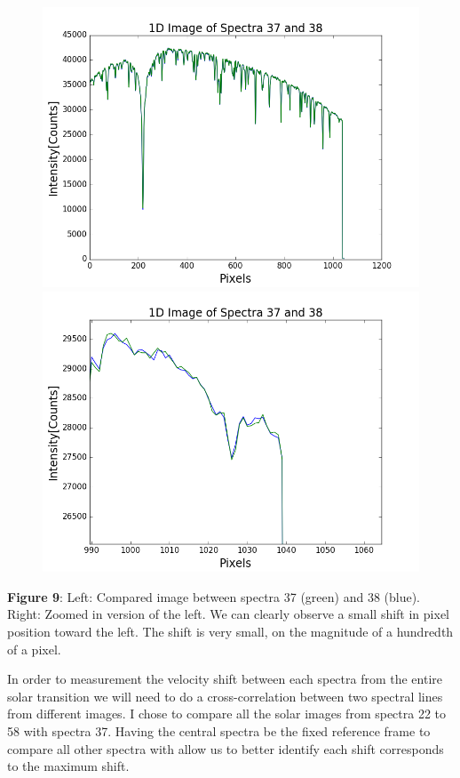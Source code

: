 \documentclass[onecolumn, 12pt, a4paper]{article}
\begin{document}
\begin{subfigure}{\linewidth}\hspace*{-1.5cm}
  \includegraphics[scale=.45]{figure_1-8.png}
  \includegraphics[scale=.45]{figure_1-9.png}
\end{subfigure}\par\medskip

\textbf{Figure 9}: Left: Compared image between spectra 37 (green) and 38 (blue). Right: Zoomed in version of the left. We can clearly observe a small shift in pixel position toward the left. The shift is very small, on the magnitude of a hundredth of a pixel. \newline

In order to measurement the velocity shift between each spectra from the entire solar transition we will need to do a cross-correlation between two spectral lines from different images. I chose to compare all the solar images from spectra 22 to 58 with spectra 37. Having the central spectra be the fixed reference frame to compare all other spectra with allow us to better identify each shift corresponds to the maximum shift.\newline
\end{document}
